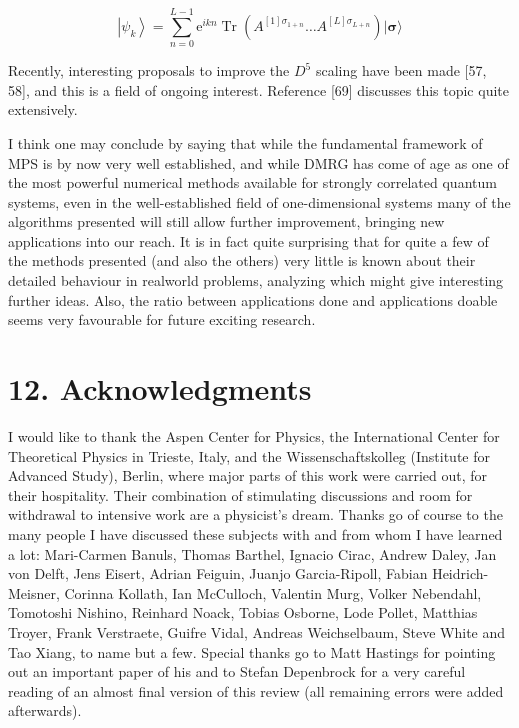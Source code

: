 \documentclass[12pt]{article}
\begin{document}
\begin{equation*}
\left|\psi_{k}\right\rangle=\sum_{n=0}^{L-1} \mathrm{e}^{i k n} \operatorname{Tr}\left(A^{[1] \sigma_{1+n}} \ldots A^{[L] \sigma_{L+n}}\right)|\boldsymbol{\sigma}\rangle \tag{362}
\end{equation*}


Recently, interesting proposals to improve the $D^{5}$ scaling have been made [57, 58], and this is a field of ongoing interest. Reference [69] discusses this topic quite extensively.

I think one may conclude by saying that while the fundamental framework of MPS is by now very well established, and while DMRG has come of age as one of the most powerful numerical methods available for strongly correlated quantum systems, even in the well-established field of one-dimensional systems many of the algorithms presented will still allow further improvement, bringing new applications into our reach. It is in fact quite surprising that for quite a few of the methods presented (and also the others) very little is known about their detailed behaviour in realworld problems, analyzing which might give interesting further ideas. Also, the ratio between applications done and applications doable seems very favourable for future exciting research.

\section*{12. Acknowledgments}
I would like to thank the Aspen Center for Physics, the International Center for Theoretical Physics in Trieste, Italy, and the Wissenschaftskolleg (Institute for Advanced Study), Berlin, where major parts of this work were carried out, for their hospitality. Their combination of stimulating discussions and room for withdrawal to intensive work are a physicist's dream. Thanks go of course to the many people I have discussed these subjects with and from whom I have learned a lot: Mari-Carmen Banuls, Thomas Barthel, Ignacio Cirac, Andrew Daley, Jan von Delft, Jens Eisert, Adrian Feiguin, Juanjo Garcia-Ripoll, Fabian Heidrich-Meisner, Corinna Kollath, Ian McCulloch, Valentin Murg, Volker Nebendahl, Tomotoshi Nishino, Reinhard Noack, Tobias Osborne, Lode Pollet, Matthias Troyer, Frank Verstraete, Guifre Vidal, Andreas Weichselbaum, Steve White and Tao Xiang, to name but a few. Special thanks go to Matt Hastings for pointing out an important paper of his and to Stefan Depenbrock for a very careful reading of an almost final version of this review (all remaining errors were added afterwards).
\end{document}
